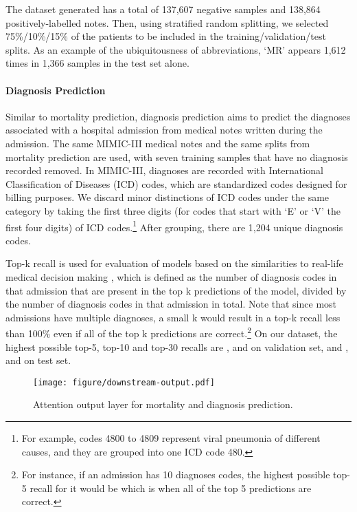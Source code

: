 \documentclass[11pt,a4paper]{article}
\begin{document}
The dataset generated has a total of 137,607 negative samples and 138,864 positively-labelled notes. Then, using stratified random splitting, we selected 75\%/10\%/15\% of the patients to be included in the training/validation/test splits. As an example of the ubiquitousness of abbreviations, `MR' appears 1,612 times in 1,366 samples in the test set alone. 

\paragraph{Diagnosis Prediction}

Similar to mortality prediction, diagnosis prediction aims to predict the diagnoses associated with a hospital admission from medical notes written during the admission. The same MIMIC-III medical notes and the same splits from mortality prediction are used, with seven training samples that have no diagnosis recorded removed. In MIMIC-III, diagnoses are recorded with International Classification of Diseases (ICD) codes, which are standardized codes designed for billing purposes. We discard minor distinctions of ICD codes under the same category by taking the first three digits (for codes that start with `E' or `V' the first four digits) of ICD codes.\footnote{For example, codes 4800 to 4809 represent viral pneumonia of different causes, and they are grouped into one ICD code 480.} After grouping, there are 1,204 unique diagnosis codes. 

Top-k recall is used for evaluation of models based on the similarities to real-life medical decision making \citep{Choi2015}, which is defined as the number of diagnosis codes in that admission that are present in the top k predictions of the model, divided by the number of diagnosis codes in that admission in total. Note that since most admissions have multiple diagnoses, a small k would result in a top-k recall less than 100\% even if all of the top k predictions are correct.\footnote{For instance, if an admission has 10 diagnoses codes, the highest possible top-5 recall for it would be  which is when all of the top 5 predictions are correct.} On our dataset, the highest possible top-5, top-10 and top-30 recalls are ,  and  on validation set, and ,  and  on test set.

\begin{figure}[t]
    \centering
    \texttt{[image: figure/downstream-output.pdf]}
    \caption{Attention output layer for mortality and diagnosis prediction.}
    \label{fig:mimic-out}
\end{figure}
\end{document}
